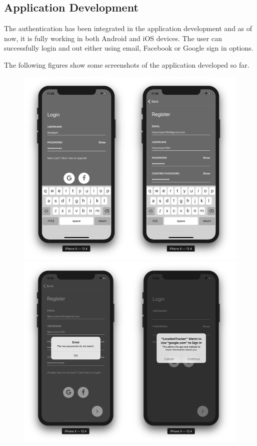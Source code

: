 \documentclass[12pt, a4paper, oneside]{article}
\begin{document}
\subsection{Application Development}
The authentication has been integrated in the application development and as of now, it is fully working in both Android and iOS devices. The user can successfully login and out either using email, Facebook or Google sign in options.

The following figures show some screenshots of the application developed so far.

\begin{figure}[H]
\centering
	\includegraphics[width=\linewidth]{screenshots/1.png}	
	\includegraphics[width=\linewidth]{screenshots/2.png}	
\end{figure}
\end{document}
